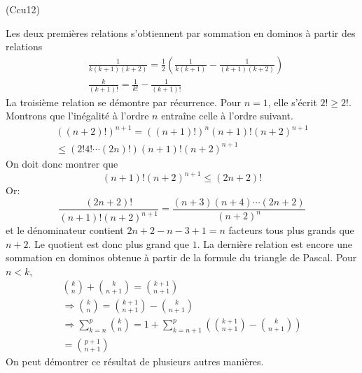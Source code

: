 \begin{tiny}(Ccu12)\end{tiny} Les deux premières relations s'obtiennent par sommation en dominos à partir des relations
\begin{align*}
  &\frac{1}{k(k+1)(k+2)} = \frac{1}{2}\left( \frac{1}{k(k+1)} - \frac{1}{(k+1)(k+2)}\right) \\
  &\frac{k}{(k+1)!} = \frac{1}{k!} - \frac{1}{(k+1)!}
\end{align*}
La troisième relation se démontre par récurrence.\newline
Pour $n=1$, elle s'écrit $2! \geq 2!$.\newline
Montrons que l'inégalité à l'ordre $n$ entraîne celle à l'ordre suivant.
\begin{multline*}
  ((n+2)!)^{n+1} = ((n+1)!)^{n}(n+1)!(n+2)^{n+1} \\
  \leq \left( 2!4!\cdots (2n)!\right)(n+1)!(n+2)^{n+1} 
\end{multline*}
On doit donc montrer que 
\begin{displaymath}
  (n+1)!(n+2)^{n+1} \leq (2n+2)!
\end{displaymath}
Or:
\begin{displaymath}
  \frac{(2n+2)!}{(n+1)!(n+2)^{n+1}} = \frac{(n+3)(n+4)\cdots (2n+2)}{(n+2)^{n}}
\end{displaymath}
et le dénominateur contient $2n+2-n-3+1=n$ facteurs tous plus grands que $n+2$. Le quotient est donc plus grand que $1$.\newline
La dernière relation est encore une sommation en dominos obtenue à partir de la formule du triangle de Pascal. Pour $n<k$,
\begin{multline*}
\binom{k}{n} + \binom{k}{n+1} = \binom{k+1}{n+1} \\
\Rightarrow \binom{k}{n} = \binom{k+1}{n+1} - \binom{k}{n+1} \\
\Rightarrow
\sum_{k=n}^p \binom{k}{n} = 1 + \sum_{k=n+1}^p\left( \binom{k+1}{n+1} - \binom{k}{n+1}\right)\\
= \binom{p+1}{n+1}
\end{multline*}
On peut démontrer ce résultat de plusieurs autres manières.